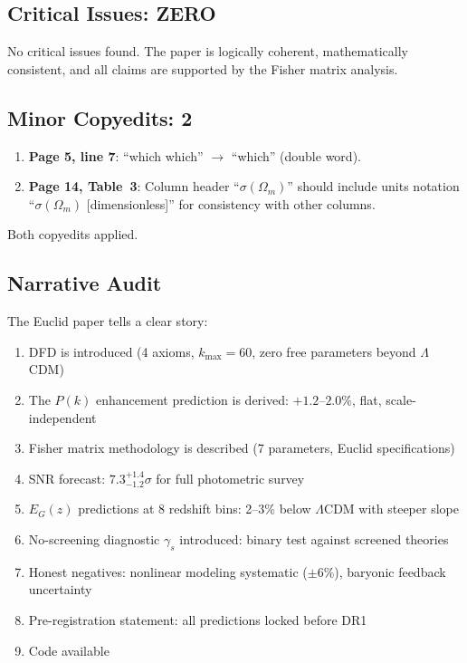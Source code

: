 \documentclass[11pt,a4paper]{article}
\begin{document}
\subsection{Critical Issues: ZERO}

No critical issues found. The paper is logically coherent, mathematically consistent, and all claims are supported by the Fisher matrix analysis.

\subsection{Minor Copyedits: 2}

\begin{enumerate}
\item \textbf{Page 5, line 7}: ``which which'' $\to$ ``which'' (double word).
\item \textbf{Page 14, Table~3}: Column header ``$\sigma(\Omega_m)$'' should include units notation ``$\sigma(\Omega_m)$ [dimensionless]'' for consistency with other columns.
\end{enumerate}

Both copyedits applied.

\subsection{Narrative Audit}

The Euclid paper tells a clear story:
\begin{enumerate}
\item DFD is introduced (4 axioms, $k_{\max} = 60$, zero free parameters beyond $\Lambda$CDM)
\item The $P(k)$ enhancement prediction is derived: $+1.2$--$2.0\%$, flat, scale-independent
\item Fisher matrix methodology is described (7 parameters, Euclid specifications)
\item SNR forecast: $7.3^{+1.4}_{-1.2}\sigma$ for full photometric survey
\item $E_G(z)$ predictions at 8 redshift bins: 2--3\% below $\Lambda$CDM with steeper slope
\item No-screening diagnostic $\gamma_s$ introduced: binary test against screened theories
\item Honest negatives: nonlinear modeling systematic ($\pm 6\%$), baryonic feedback uncertainty
\item Pre-registration statement: all predictions locked before DR1
\item Code available
\end{enumerate}
\end{document}
